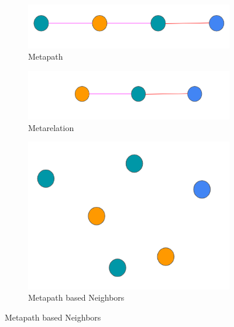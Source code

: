 \documentclass{report} %
\begin{document}
\begin{figure}[H]
    \centering
    \begin{subfigure}{0.35\textwidth}
        \centering
        \includegraphics[width=\textwidth]{./ReportImages/Metapath.png}
        \caption{Metapath} 
        \label{fig:Metapath}
    \end{subfigure}\hfill
    \begin{subfigure}{0.35\textwidth}
        \centering
        \includegraphics[width=\textwidth]{./ReportImages/Metarelation.png}
        \caption{Metarelation}
        \label{fig:Metarelation}
    \end{subfigure}\vfill
    \begin{subfigure}{0.35\textwidth}
        \centering
        \includegraphics[width=\textwidth]{./ReportImages/MetapathNeighbors.png}
        \caption{Metapath based Neighbors} %
        \label{fig:MetapathNeighbors}
    \end{subfigure}\hfill

\end{figure}
\end{document}
